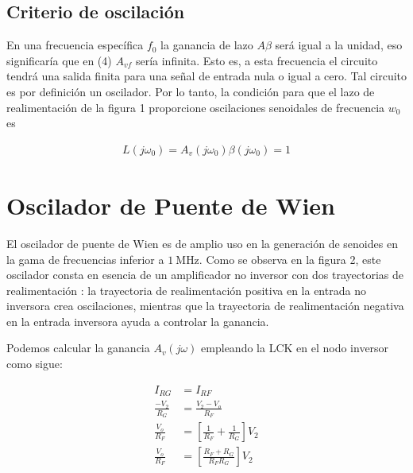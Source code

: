 \documentclass{article}
\begin{document}
\subsection{Criterio de oscilación}
En una frecuencia específica $f_0$ la ganancia de lazo $A \beta$ será igual a la unidad, eso significaría que en (4) $A_{vf}$ sería infinita. Esto es, a esta frecuencia el circuito tendrá una salida finita para una señal de entrada nula o igual a cero. Tal circuito es por definición un oscilador. Por lo tanto, la condición para que el lazo de realimentación de la figura 1 proporcione oscilaciones senoidales de frecuencia $w_0$ es

\begin{align}
	L(j\omega_0) = A_v(j \omega_0)\beta(j\omega_0) = 1
\end{align}

\section*{Oscilador de Puente de Wien}
El oscilador de puente de Wien es de amplio uso en la generación de senoides en la gama de frecuencias inferior a $\qty{1}{\mega \hertz}$.
Como se observa en la figura 2, este oscilador consta en esencia de un amplificador no inversor con dos trayectorias de realimentación : la trayectoria de realimentación positiva en la entrada no inversora crea oscilaciones, mientras que la trayectoria de realimentación negativa en la entrada inversora ayuda a controlar la ganancia.

Podemos calcular la ganancia $A_v(j \omega)$ empleando la LCK en el nodo inversor como sigue:

\begin{align}
	I_{RG} &= I_{RF} \nonumber \\
	\frac{-V_2}{R_G} &= \frac{V_2 - V_o}{R_F} \nonumber \\
	\frac{V_o}{R_F} &= \left[ \frac{1}{R_F} + \frac{1}{R_G} \right] V_2  \nonumber \\
	\frac{V_o}{R_F} &= \left[ \frac{R_F + R_G}{R_F R_G} \right] V_2  \nonumber
\end{align}
\end{document}
